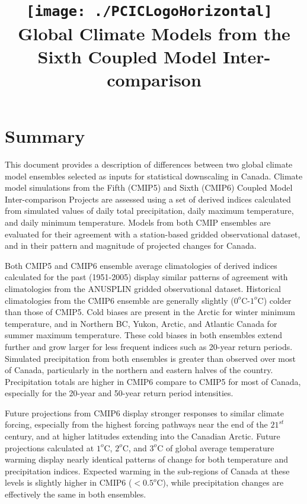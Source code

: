\documentclass[]{scrartcl}
\title{\texttt{[image: ./PCICLogoHorizontal]}\vspace{50pt}~\\Global Climate Models from the Sixth Coupled Model Inter-comparison}
\author{}
\begin{document}
\date{} %
\maketitle
\thispagestyle{empty}

\section{Summary}
This document provides a description of differences between two global climate model ensembles selected as inputs for statistical downscaling in Canada. Climate model simulations from the Fifth (CMIP5) and Sixth (CMIP6) Coupled Model Inter-comparison Projects are assessed using a set of derived indices calculated from simulated values of daily total precipitation, daily maximum temperature, and daily minimum temperature. Models from both CMIP ensembles are evaluated for their agreement with a station-based gridded observational dataset, and in their pattern and magnitude of projected changes for Canada. 

Both CMIP5 and CMIP6 ensemble average climatologies of derived indices calculated for the past (1951-2005) display similar patterns of agreement with climatologies from the ANUSPLIN gridded observational dataset. Historical climatologies from the CMIP6 ensemble are generally slightly ($0^o$C-$1^o$C) colder than those of CMIP5. Cold biases are present in the Arctic for winter minimum temperature, and in Northern BC, Yukon, Arctic, and Atlantic Canada for summer maximum temperature. These cold biases in both ensembles extend further and grow larger for less frequent indices such as 20-year return periods. Simulated precipitation from both ensembles is greater than observed over most of Canada, particularly in the northern and eastern halves of the country. Precipitation totals are higher in CMIP6 compare to CMIP5 for most of Canada, especially for the 20-year and 50-year return period intensities.

Future projections from CMIP6 display stronger responses to similar climate forcing, especially from the highest forcing pathways near the end of the $21^{st}$ century, and at higher latitudes extending into the Canadian Arctic. Future projections calculated at $1^o$C, $2^o$C, and $3^o$C of global average temperature warming display nearly identical patterns of change for both temperature and precipitation indices. Expected warming in the sub-regions of Canada at these levels is slightly higher in CMIP6 ($<0.5^o$C), while precipitation changes are effectively the same in both ensembles.
\end{document}
